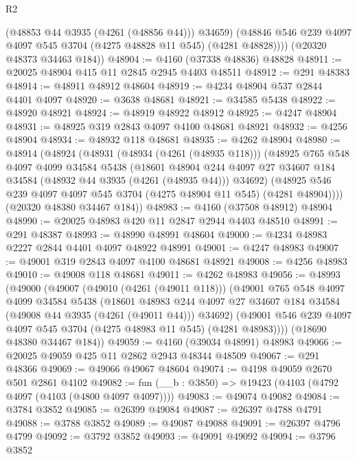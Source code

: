 \begin{lexlean}{R2}
\begin{coremodule}
            (@48853 @44 @3935 (@4261 (@48856 @44)))
            @34659)
          (@48846 @546 @239 @4097 @4097 @545 @3704 (@4275 @48828 @11 @545) (@4281 @48828))))
      (@20320 @48373 @34463 @184))
@48904 := @4160 (@37338 @48836) @48828
@48911 := @20025 @48904 @415 @11 @2845 @2945 @4403 @48511
@48912 := @291 @48383
@48914 := @48911 @48912 @48604
@48919 := @4234 @48904 @537 @2844 @4401 @4097
@48920 := @3638 @48681
@48921 := @34585 @5438
@48922 := @48920 @48921
@48924 := @48919 @48922 @48912
@48925 := @4247 @48904
@48931 := @48925 @319 @2843 @4097 @4100 @48681 @48921
@48932 := @4256 @48904
@48934 := @48932 @118 @48681
@48935 := @4262 @48904
@48980 := @48914
    (@48924
      (@48931
        (@48934 (@4261 (@48935 @118)))
        (@48925
          @765
          @548
          @4097
          @4099
          @34584
          @5438
          (@18601
            @48904
            @244
            @4097
            @27
            @34607
            @184
            @34584
            (@48932 @44 @3935 (@4261 (@48935 @44)))
            @34692)
          (@48925 @546 @239 @4097 @4097 @545 @3704 (@4275 @48904 @11 @545) (@4281 @48904))))
      (@20320 @48380 @34467 @184))
@48983 := @4160 (@37508 @48912) @48904
@48990 := @20025 @48983 @420 @11 @2847 @2944 @4403 @48510
@48991 := @291 @48387
@48993 := @48990 @48991 @48604
@49000 := @4234 @48983 @2227 @2844 @4401 @4097 @48922 @48991
@49001 := @4247 @48983
@49007 := @49001 @319 @2843 @4097 @4100 @48681 @48921
@49008 := @4256 @48983
@49010 := @49008 @118 @48681
@49011 := @4262 @48983
@49056 := @48993
    (@49000
      (@49007
        (@49010 (@4261 (@49011 @118)))
        (@49001
          @765
          @548
          @4097
          @4099
          @34584
          @5438
          (@18601
            @48983
            @244
            @4097
            @27
            @34607
            @184
            @34584
            (@49008 @44 @3935 (@4261 (@49011 @44)))
            @34692)
          (@49001 @546 @239 @4097 @4097 @545 @3704 (@4275 @48983 @11 @545) (@4281 @48983))))
      (@18690 @48380 @34467 @184))
@49059 := @4160 (@39034 @48991) @48983
@49066 := @20025 @49059 @425 @11 @2862 @2943 @48344 @48509
@49067 := @291 @48366
@49069 := @49066 @49067 @48604
@49074 := @4198 @49059 @2670 @501 @2861 @4102
@49082 := fun (__b : @3850) => @19423 (@4103 (@4792 @4097 (@4103 (@4800 @4097 @4097))))
@49083 := @49074 @49082
@49084 := @3784 @3852
@49085 := @26399 @49084
@49087 := @26397 @4788 @4791
@49088 := @3788 @3852
@49089 := @49087 @49088
@49091 := @26397 @4796 @4799
@49092 := @3792 @3852
@49093 := @49091 @49092
@49094 := @3796 @3852

\end{coremodule}
\end{lexlean}
